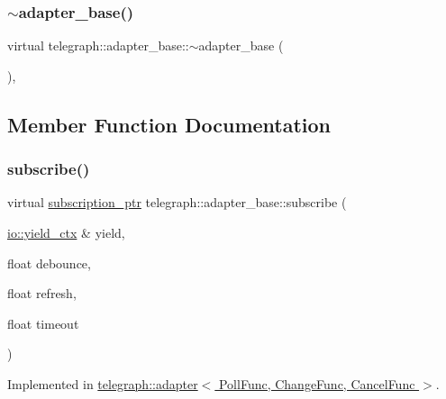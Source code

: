 \subsubsection{\texorpdfstring{$\sim$adapter\+\_\+base()}{~adapter\_base()}}
{\footnotesize\ttfamily virtual telegraph\+::adapter\+\_\+base\+::$\sim$adapter\+\_\+base (\begin{DoxyParamCaption}{ }\end{DoxyParamCaption})\hspace{0.3cm}{\ttfamily [inline]}, {\ttfamily [virtual]}}



\subsection{Member Function Documentation}
\mbox{\label{classtelegraph_1_1adapter__base_a2fa110e124bc9a86c9433fe04033ff06}} 
\subsubsection{\texorpdfstring{subscribe()}{subscribe()}}
{\footnotesize\ttfamily virtual \hyperlink{namespacetelegraph_a58641aa5b1a2cbdb0431916a87069f64}{subscription\+\_\+ptr} telegraph\+::adapter\+\_\+base\+::subscribe (\begin{DoxyParamCaption}\item[{\hyperlink{structboost_1_1asio_1_1yield__ctx}{io\+::yield\+\_\+ctx} \&}]{yield,  }\item[{float}]{debounce,  }\item[{float}]{refresh,  }\item[{float}]{timeout }\end{DoxyParamCaption})\hspace{0.3cm}{\ttfamily [pure virtual]}}



Implemented in \hyperlink{classtelegraph_1_1adapter_a0b9c93d0584817ca7dfd74f4ae38ebad}{telegraph\+::adapter$<$ Poll\+Func, Change\+Func, Cancel\+Func $>$}.

\mbox{\label{classtelegraph_1_1adapter__base_a3b2347f991a3c621b35f20f81419cf62}} 
